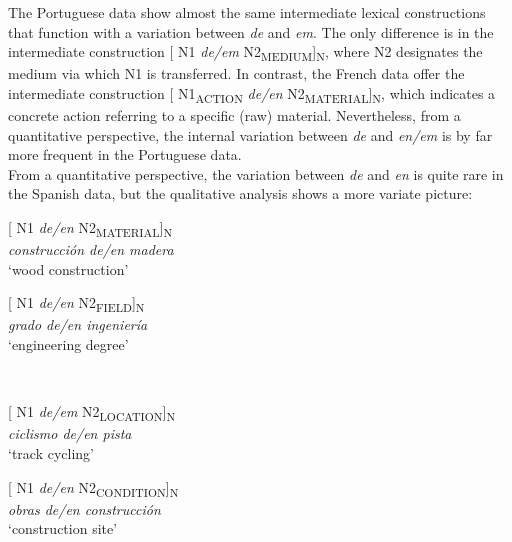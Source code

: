 \documentclass[output=paper]{langsci/langscibook}
\begin{document}
The Portuguese data show almost the same intermediate lexical constructions that function with a variation between \textit{de} and \textit{em}. The only difference is in the intermediate construction [ N1 \textit{de/em} N2\textsubscript{MEDIUM}]\textsubscript{N}, where N2 designates the medium via which N1 is transferred. In contrast, the French data offer the intermediate construction [ N1\textsubscript{ACTION} \textit{de/en} N2\textsubscript{MATERIAL}]\textsubscript{N}, which indicates a concrete action referring to a specific (raw) material. Nevertheless, from a quantitative perspective, the internal variation between \textit{de} and \textit{en/em} is by far more frequent in the Portuguese data.\\

 From a quantitative perspective, the variation between \textit{de} and \textit{en} is quite rare in the Spanish data, but the qualitative analysis shows a more variate picture:\\


\begin{minipage}{0.4\textwidth}    %
[ N1 \textit{de/en} N2\textsubscript{MATERIAL}]\textsubscript{N}\\
\textit{construcción de/en madera }\\
`wood construction'
\end{minipage}
\hfill            %
\begin{minipage}{0.4\textwidth}
[ N1 \textit{de/en} N2\textsubscript{FIELD}]\textsubscript{N}\\
\textit{grado de/en ingeniería}\\
`engineering degree'
\end{minipage} \\
\hfill  
\vspace{0.5cm}

\begin{minipage}{0.4\textwidth}    %
[ N1 \textit{de/em} N2\textsubscript{LOCATION}]\textsubscript{N}\\
\textit{ciclismo de/en pista}\\
`track cycling'
\end{minipage}
\hfill            %
\begin{minipage}{0.4\textwidth}
[ N1 \textit{de/en} N2\textsubscript{CONDITION}]\textsubscript{N}\\
\textit{obras de/en construcción}\\
`construction site'
\end{minipage} \\
\hfill
\vspace{0.5cm}
\end{document}

